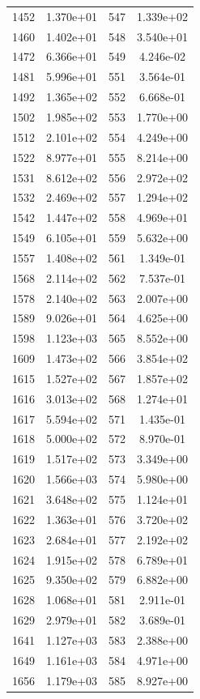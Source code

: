 \documentclass[12pt]{article}
\begin{document}
\begin{longtable}{@{}cccc@{}}
1452 & 1.370e+01 & 547 & 1.339e+02 \\
1460 & 1.402e+01 & 548 & 3.540e+01 \\
1472 & 6.366e+01 & 549 & 4.246e-02 \\
1481 & 5.996e+01 & 551 & 3.564e-01 \\
1492 & 1.365e+02 & 552 & 6.668e-01 \\
1502 & 1.985e+02 & 553 & 1.770e+00 \\
1512 & 2.101e+02 & 554 & 4.249e+00 \\
1522 & 8.977e+01 & 555 & 8.214e+00 \\
1531 & 8.612e+02 & 556 & 2.972e+02 \\
1532 & 2.469e+02 & 557 & 1.294e+02 \\
1542 & 1.447e+02 & 558 & 4.969e+01 \\
1549 & 6.105e+01 & 559 & 5.632e+00 \\
1557 & 1.408e+02 & 561 & 1.349e-01 \\
1568 & 2.114e+02 & 562 & 7.537e-01 \\
1578 & 2.140e+02 & 563 & 2.007e+00 \\
1589 & 9.026e+01 & 564 & 4.625e+00 \\
1598 & 1.123e+03 & 565 & 8.552e+00 \\
1609 & 1.473e+02 & 566 & 3.854e+02 \\
1615 & 1.527e+02 & 567 & 1.857e+02 \\
1616 & 3.013e+02 & 568 & 1.274e+01 \\
1617 & 5.594e+02 & 571 & 1.435e-01 \\
1618 & 5.000e+02 & 572 & 8.970e-01 \\
1619 & 1.517e+02 & 573 & 3.349e+00 \\
1620 & 1.566e+03 & 574 & 5.980e+00 \\
1621 & 3.648e+02 & 575 & 1.124e+01 \\
1622 & 1.363e+01 & 576 & 3.720e+02 \\
1623 & 2.684e+01 & 577 & 2.192e+02 \\
1624 & 1.915e+02 & 578 & 6.789e+01 \\
1625 & 9.350e+02 & 579 & 6.882e+00 \\
1628 & 1.068e+01 & 581 & 2.911e-01 \\
1629 & 2.979e+01 & 582 & 3.689e-01 \\
1641 & 1.127e+03 & 583 & 2.388e+00 \\
1649 & 1.161e+03 & 584 & 4.971e+00 \\
1656 & 1.179e+03 & 585 & 8.927e+00 \\

\end{longtable}
\end{document}
